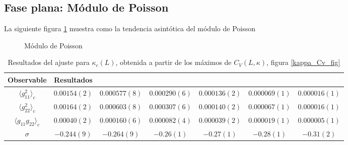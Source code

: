 \clearpage

\subsection{Fase plana: Módulo de Poisson}

La siguiente figura \ref{poisson-fig} muestra como la tendencia asintótica del
módulo de Poisson 
\begin{figure}[h]
  \centering
  
  \caption{Módulo de Poisson}\label{poisson-fig}
\end{figure}

\begin{table}[h]
\centering
\begin{tabular}{|c|c|c|c|c|c|c|}\hline
 Observable              & Resultados & & & &\\ \hline\hline
 $\langle g_{11}^2 \rangle_c$  & $0.00154(2) $& $0.000577(8)$  & $0.000290(6)$
                              & $0.000136(2)$& $0.000069(1)$  & $0.000016(1)$\\ \hline
 $\langle g_{22}^2 \rangle_c$  & $0.00164(2) $&  $0.000603(8)$ & $0.000307(6)$
                              & $0.000140(2)$& $0.000067(1)$  & $0.000016(1)$    \\ \hline
$\langle g_{11}g_{22} \rangle_c$& $0.00040(2)$ &  $0.000160(6)$ & $0.000082(4)$
                              & $0.000039(2)$ & $0.000019(1)$ & $0.000005(1)$\\ \hline
$\sigma$                      & $ -0.244(9)$ &  $-0.264(9)$   & $-0.26(1)$ 
                              & $-0.27(1)$   & $-0.28(1)$     & $-0.31(2)$\\ \hline
\end{tabular}
\caption{Resultados del ajuste para $\kappa_c(L)$, obtenida a partir de los
  máximos de $C_V(L,\kappa)$, figura \ref{kappa_Cv_fig}}\label{kappa_Cv_tab}
\end{table}

